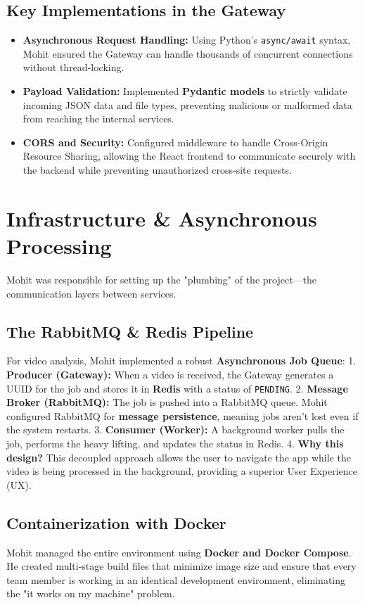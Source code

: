 \documentclass[12pt]{article}
\begin{document}
\subsection{Key Implementations in the Gateway}
\begin{itemize}
    \item \textbf{Asynchronous Request Handling:} Using Python’s \texttt{async/await} syntax, Mohit ensured the Gateway can handle thousands of concurrent connections without thread-locking.
    \item \textbf{Payload Validation:} Implemented \textbf{Pydantic models} to strictly validate incoming JSON data and file types, preventing malicious or malformed data from reaching the internal services.
    \item \textbf{CORS and Security:} Configured middleware to handle Cross-Origin Resource Sharing, allowing the React frontend to communicate securely with the backend while preventing unauthorized cross-site requests.
\end{itemize}

\section{Infrastructure & Asynchronous Processing}
Mohit was responsible for setting up the "plumbing" of the project—the communication layers between services.

\subsection{The RabbitMQ & Redis Pipeline}
For video analysis, Mohit implemented a robust \textbf{Asynchronous Job Queue}:
1. \textbf{Producer (Gateway):} When a video is received, the Gateway generates a UUID for the job and stores it in \textbf{Redis} with a status of \texttt{PENDING}.
2. \textbf{Message Broker (RabbitMQ):} The job is pushed into a RabbitMQ queue. Mohit configured RabbitMQ for \textbf{message persistence}, meaning jobs aren't lost even if the system restarts.
3. \textbf{Consumer (Worker):} A background worker pulls the job, performs the heavy lifting, and updates the status in Redis.
4. \textbf{Why this design?} This decoupled approach allows the user to navigate the app while the video is being processed in the background, providing a superior User Experience (UX).

\subsection{Containerization with Docker}
Mohit managed the entire environment using \textbf{Docker and Docker Compose}. He created multi-stage build files that minimize image size and ensure that every team member is working in an identical development environment, eliminating the "it works on my machine" problem.
\end{document}
